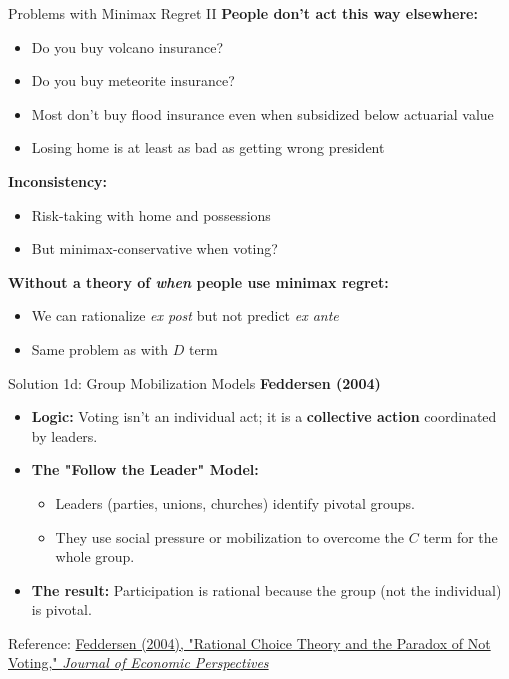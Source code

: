 \documentclass[10pt]{beamer}
\begin{document}
\begin{frame}{Problems with Minimax Regret II}
\textbf{People don't act this way elsewhere:}


\begin{itemize}
\item Do you buy volcano insurance?
\item Do you buy meteorite insurance?
\item Most don't buy flood insurance even when subsidized below actuarial value
\item Losing home is at least as bad as getting wrong president
\end{itemize}


\textbf{Inconsistency:}
\begin{itemize}
\item Risk-taking with home and possessions
\item But minimax-conservative when voting?
\end{itemize}


\textbf{Without a theory of \emph{when} people use minimax regret:}
\begin{itemize}
\item We can rationalize \emph{ex post} but not predict \emph{ex ante}
\item Same problem as with $D$ term
\end{itemize}
\end{frame}

\begin{frame}{Solution 1d: Group Mobilization Models}
\textbf{Feddersen (2004)}

\begin{itemize}
\item \textbf{Logic:} Voting isn't an individual act; 
  it is a \textbf{collective action} coordinated by leaders.
\item \textbf{The "Follow the Leader" Model:}
\begin{itemize}
\item Leaders (parties, unions, churches) identify pivotal groups.
\item They use social pressure or mobilization to overcome 
  the $C$ term for the whole group.
\end{itemize}
\item \textbf{The result:} Participation is rational because 
  the group (not the individual) is pivotal.
\end{itemize}

\footnotesize{Reference: \href{https://pubs.aeaweb.org/doi/pdf/10.1257/089533004773563458}{\alert{Feddersen (2004), "Rational Choice Theory and the Paradox of Not Voting," \emph{Journal of Economic Perspectives}}}}
\end{frame}
\end{document}

